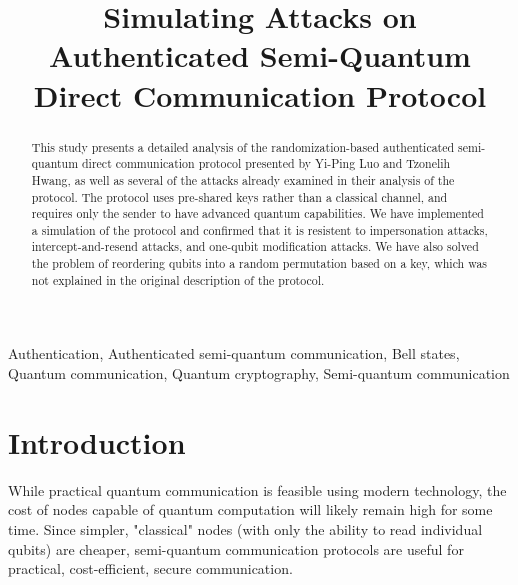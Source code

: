 \documentclass[conference]{IEEEtran}
\begin{document}
\title{Simulating Attacks on Authenticated Semi-Quantum Direct Communication Protocol}

\author{
\and
{}
}

\maketitle

\begin{abstract}

This study presents a detailed analysis of the randomization-based authenticated semi-quantum direct
communication protocol presented by Yi-Ping Luo and Tzonelih Hwang, as well as several of the attacks
already examined in their analysis of the protocol. The protocol uses pre-shared keys
rather than a classical channel, and requires only the sender to have advanced quantum capabilities.
We have implemented a simulation of the protocol and confirmed that it is resistent to impersonation
attacks, intercept-and-resend attacks, and one-qubit modification attacks. We have also solved
the problem of reordering qubits into a random permutation based on a key,
which was not explained in the original description of the protocol.

\end{abstract}

\begin{IEEEkeywords}

Authentication,
Authenticated semi-quantum communication,
Bell states,
Quantum communication,
Quantum cryptography,
Semi-quantum communication

\end{IEEEkeywords}

\section{Introduction}

While practical quantum communication is feasible using
modern technology, the cost of nodes capable of quantum computation
will likely remain high for some time. Since simpler, "classical" nodes
(with only the ability to read individual qubits) are cheaper,
semi-quantum communication protocols are useful for practical,
cost-efficient, secure communication.
\end{document}
